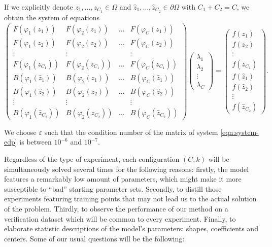 \documentclass[12pt]{report} %
\begin{document}
If we explicitly denote $z_1, \ldots, z_{C_1} \in \Omega$ and $\hat{z}_1,
\ldots, \hat{z}_{C_2} \in \partial \Omega$ with $C_1+C_2=C$, we obtain the system of equations
\begin{equation}
  \left(\begin{array}{cccc}
    F (\varphi_1 (z_1)) & F (\varphi_2 (z_1)) & \ldots & F (\varphi_C (z_1))\\
    F (\varphi_1 (z_2)) & F (\varphi_2 (z_2)) & \ldots & F (\varphi_C (z_2))\\
    \vdots & \vdots &  & \vdots\\
    F (\varphi_1 (z_{C_1})) & F (\varphi_2 (z_{C_1})) & \ldots & F (\varphi_C
    (z_{C_1}))\\
    B (\varphi_1 (\hat{z}_1)) & B (\varphi_2 (\hat{z}_1)) & \ldots & B
    (\varphi_C (\hat{z}_1))\\
    B (\varphi_1 (\hat{z}_2)) & B (\varphi_2 (\hat{z}_2)) & \ldots & B
    (\varphi_C (\hat{z}_2))\\
    \vdots & \vdots &  & \vdots\\
    B (\varphi_1 (\hat{z}_{C_2})) & B (\varphi_2 (\hat{z}_{C_2})) & \ldots & B
    (\varphi_C (\hat{z}_{C_2}))
  \end{array}\right) \left(\begin{array}{c}
    \lambda_1\\
    \lambda_2\\
    \vdots\\
    \lambda_C
  \end{array}\right) = \left(\begin{array}{c}
    f (z_1)\\
    f (z_2)\\
    \vdots\\
    f (z_{C_1})\\
    f (\hat{z}_1)\\
    f (\hat{z}_2)\\
    \vdots\\
    f (\hat{z}_{C_2})
  \end{array}\right) \label{eqn:system-edp} .
\end{equation}


We choose $\varepsilon$ such that the condition number of the matrix of
system \eqref{eqn:system-edp} is between $10^{- 6}$ and $10^{- 7}$.


Regardless of the type of experiment, each configuration $(C,k)$ will be simultaneously solved several times for the following reasons: firstly, the model features a remarkably low amount of parameters, which might make it more susceptible to ``bad'' starting parameter sets. Secondly, to distill those experiments featuring training points that may not lead us to the actual solution of the problem. Thirdly, to observe the performance of our method on a verification dataset which will be common to every experiment. Finally, to elaborate statistic descriptions of the model's parameters: shapes, coefficients and centers. Some of our usual questions will be the following:
\end{document}
